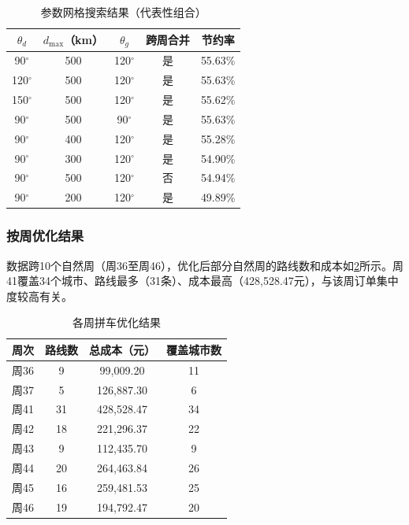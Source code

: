 \begin{table}[!h]
    \centering
    \begin{tabular}{ccccc}
        \toprule[1.5pt]
        $\theta_d$ & $d_{\max}$（km）& $\theta_g$ & 跨周合并 & 节约率 \\
        \midrule[1pt]
        90$^\circ$ & 500 & 120$^\circ$ & 是 & 55.63\% \\
        120$^\circ$ & 500 & 120$^\circ$ & 是 & 55.63\% \\
        150$^\circ$ & 500 & 120$^\circ$ & 是 & 55.62\% \\
        90$^\circ$ & 500 & 90$^\circ$ & 是 & 55.63\% \\
        90$^\circ$ & 400 & 120$^\circ$ & 是 & 55.28\% \\
        90$^\circ$ & 300 & 120$^\circ$ & 是 & 54.90\% \\
        90$^\circ$ & 500 & 120$^\circ$ & 否 & 54.94\% \\
        90$^\circ$ & 200 & 120$^\circ$ & 是 & 49.89\% \\
        \bottomrule[1.5pt]
    \end{tabular}\caption{参数网格搜索结果（代表性组合）}
    \label{tab:grid-results}

\end{table}

\subsubsection{按周优化结果}

数据跨10个自然周（周36至周46），优化后部分自然周的路线数和成本如\cref{tab:week-results}所示。周41覆盖34个城市、路线最多（31条）、成本最高（428{,}528.47元），与该周订单集中度较高有关。

\begin{table}[!h]
    \centering
    \begin{tabular}{lccc}
        \toprule[1.5pt]
        周次 & 路线数 & 总成本（元）& 覆盖城市数 \\
        \midrule[1pt]
        周36 & 9 & 99{,}009.20 & 11 \\
        周37 & 5 & 126{,}887.30 & 6 \\
        周41 & 31 & 428{,}528.47 & 34 \\
        周42 & 18 & 221{,}296.37 & 22 \\
        周43 & 9 & 112{,}435.70 & 9 \\
        周44 & 20 & 264{,}463.84 & 26 \\
        周45 & 16 & 259{,}481.53 & 25 \\
        周46 & 19 & 194{,}792.47 & 20 \\
        \bottomrule[1.5pt]
    \end{tabular}\caption{各周拼车优化结果}
    \label{tab:week-results}

\end{table}

